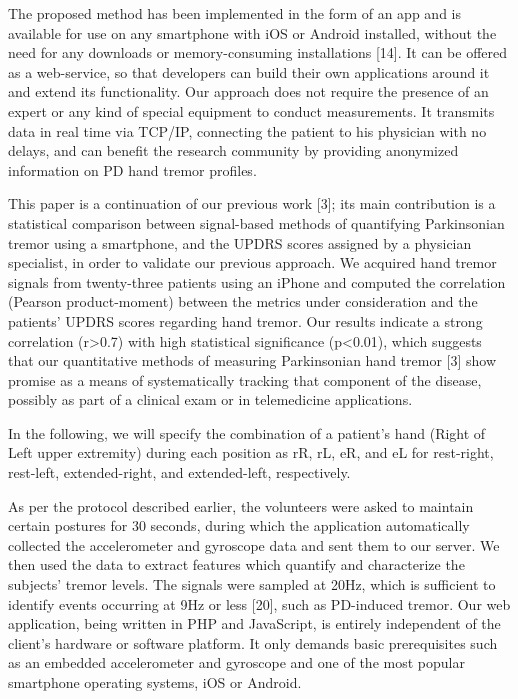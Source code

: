 The proposed method has been implemented in the form of an app and is available for use on any smartphone with iOS or Android installed, without the need for any downloads or memory-consuming installations [14]. It can be offered as a web-service, so that developers can build their own applications around it and extend its functionality. Our approach does not require the presence of an expert or any kind of special equipment to conduct measurements. It transmits data in real time via TCP/IP, connecting the patient to his physician with no delays, and can benefit the research community by providing anonymized information on PD hand tremor profiles. 



This paper is a continuation of our previous work [3]; its main contribution is a statistical comparison between signal-based methods of quantifying Parkinsonian tremor using a smartphone, and the UPDRS scores assigned by a physician specialist, in order to validate our previous approach. We acquired hand tremor signals from twenty-three patients using an iPhone and computed the correlation (Pearson product-moment) between the metrics under consideration and the patients’ UPDRS scores regarding hand tremor. Our results indicate a strong correlation (r>0.7) with high statistical significance (p<0.01), which suggests that our quantitative methods of measuring Parkinsonian hand tremor [3] show promise as a means of systematically tracking that component of the disease, possibly as part of a clinical exam or in telemedicine applications. 

In the following, we will specify the combination of a patient’s hand (Right of Left upper extremity) during each position as rR, rL, eR, and eL for rest-right, rest-left, extended-right, and extended-left, respectively.

As per the protocol described earlier, the volunteers were asked to maintain certain postures for 30 seconds, during which the application automatically collected the accelerometer and gyroscope data and sent them to our server. We then used the data to extract features which quantify and characterize the subjects’ tremor levels. The signals were sampled at 20Hz, which is sufficient to identify events occurring at 9Hz or less [20], such as PD-induced tremor. 
Our web application, being written in PHP and JavaScript, is entirely independent of the client's hardware or software platform. It only demands basic prerequisites such as an embedded accelerometer and gyroscope and one of the most popular smartphone operating systems, iOS or Android. 







